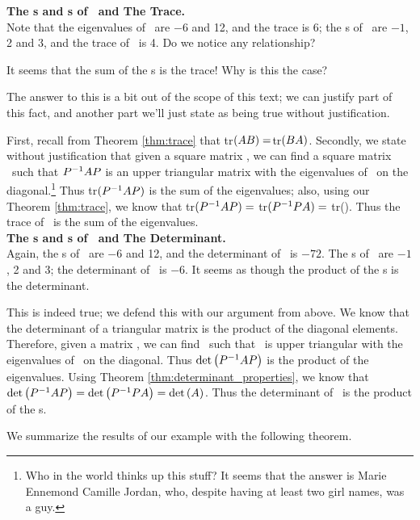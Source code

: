 \noindent \textsf{\textbf{The \el s and \ev s of \tta\ and The Trace.}}\\

Note that the eigenvalues of \tta\ are $-6$ and 12, and the trace is 6; the \el s of \ttb\ are $-1$, 2 and 3, and the trace of \ttb\ is 4. Do we notice any relationship? 

It seems that the sum of the \el s is the trace! Why is this the case?

The answer to this is a bit out of the scope of this text; we can justify part of this fact, and another part we'll just state as being true without justification. 

First, recall from Theorem \ref{thm:trace} that tr$(AB) = $tr$(BA)$. Secondly, we state without justification that given a square matrix \tta, we can find a square matrix \ttp\ such that $P^{-1}AP$ is an upper triangular matrix with the eigenvalues of \tta\ on the diagonal.\footnote{Who in the world thinks up this stuff? It seems that the answer is Marie Ennemond Camille Jordan, who, despite having at least two girl names, was a guy.} Thus tr$(P^{-1}AP)$ is the sum of the eigenvalues; also, using our Theorem \ref{thm:trace}, we know that tr$(P^{-1}AP) = $ tr$(P^{-1}PA) = $ tr(\tta). Thus the trace of \tta\ is the sum of the eigenvalues.\\

\noindent \textsf{\textbf{The \el s and \ev s of \tta\ and The Determinant.}}\\

Again, the \el s of \tta\ are $-6$ and 12, and the determinant of \tta\ is 
$-72$. The \el s of \ttb\ are $-1$, 2 and 3; the determinant of \ttb\ is $-6$. It seems as though the product of the \el s is the determinant.

This is indeed true; we defend this with our argument from above. We know that the determinant of a triangular matrix is the product of the diagonal elements. Therefore, given a matrix \tta, we can find \ttp\ such that \ttpi\tta\ttp\ is upper triangular with the eigenvalues of \tta\ on the diagonal. Thus $\text{det}\left(P^{-1}AP\right)$ is the product of the eigenvalues. Using Theorem \ref{thm:determinant_properties}, we know that $\text{det}\left(P^{-1}AP\right) = \text{det}\left(P^{-1}PA\right) = \text{det}\left(A\right)$. Thus the determinant of \tta\ is the product of the \el s.

We summarize the results of our example with the following theorem.

